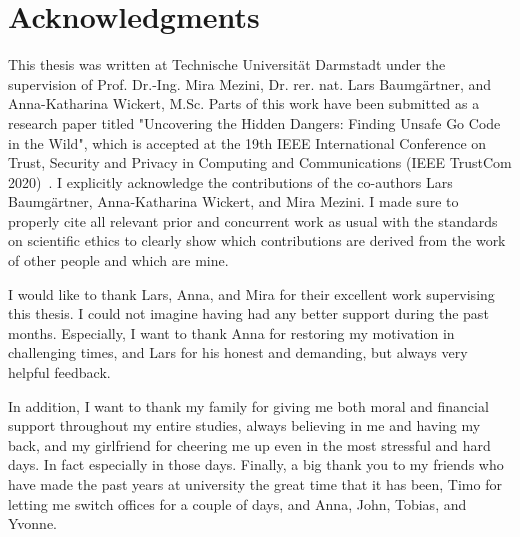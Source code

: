 \chapter*{Acknowledgments}

This thesis was written at Technische Universität Darmstadt under the supervision of Prof. Dr.-Ing. Mira Mezini,
Dr. rer. nat. Lars Baumgärtner, and Anna-Katharina Wickert, M.Sc.
Parts of this work have been submitted as a research paper titled "Uncovering the Hidden Dangers: Finding Unsafe Go Code
in the Wild", which is accepted at the 19th IEEE International Conference on Trust, Security and Privacy in
Computing and Communications (IEEE TrustCom 2020)~\cite{lauinger2020}.
I explicitly acknowledge the contributions of the co-authors Lars Baumgärtner, Anna-Katharina Wickert, and Mira Mezini.
I made sure to properly cite all relevant prior and concurrent work as usual with the standards on scientific ethics
to clearly show which contributions are derived from the work of other people and which are mine.

I would like to thank Lars, Anna, and Mira for their excellent work supervising this thesis.
I could not imagine having had any better support during the past months.
Especially, I want to thank Anna for restoring my motivation in challenging times, and Lars for his honest and
demanding, but always very helpful feedback.

In addition, I want to thank my family for giving me both moral and financial support throughout my entire studies,
always believing in me and having my back, and my girlfriend for cheering me up even in the most stressful and hard
days.
In fact especially in those days.
Finally, a big thank you to my friends who have made the past years at university the great time that it has been, Timo
for letting me switch offices for a couple of days, and Anna, John, Tobias, and Yvonne.
